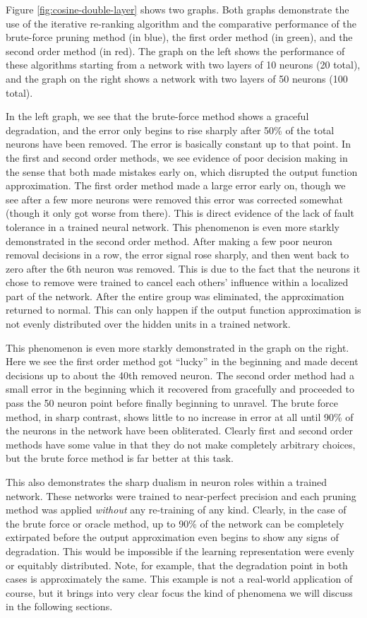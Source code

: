 Figure \ref{fig:cosine-double-layer} shows two graphs. Both graphs demonstrate the use of the iterative re-ranking algorithm and the comparative performance of the brute-force pruning method (in blue), the first order method (in green), and the second order method (in red). The graph on the left shows the performance of these algorithms starting from a network with two layers of 10 neurons (20 total), and the graph on the right shows a network with two layers of 50 neurons (100 total). 

In the left graph, we see that the brute-force method shows a graceful degradation, and the error only begins to rise sharply after 50\% of the total neurons have been removed. The error is basically constant up to that point. In the first and second order methods, we see evidence of poor decision making in the sense that both made mistakes early on, which disrupted the output function approximation. The first order method made a large error early on, though we see after a few more neurons were removed this error was corrected somewhat (though it only got worse from there). This is direct evidence of the lack of fault tolerance in a trained neural network. This phenomenon is even more starkly demonstrated in the second order method. After making a few poor neuron removal decisions in a row, the error signal rose sharply, and then went back to zero after the 6th neuron was removed. This is due to the fact that the neurons it chose to remove were trained to cancel each others' influence within a localized part of the network. After the entire group was eliminated, the approximation returned to normal. This can only happen if the output function approximation is not evenly distributed over the hidden units in a trained network. 

This phenomenon is even more starkly demonstrated in the graph on the right. Here we see the first order method got ``lucky'' in the beginning and made decent decisions up to about the 40th removed neuron. The second order method had a small error in the beginning which it recovered from gracefully and proceeded to pass the 50 neuron point before finally beginning to unravel. The brute force method, in sharp contrast, shows little to no increase in error at all until 90\% of the neurons in the network have been obliterated. Clearly first and second order methods have some value in that they do not make completely arbitrary choices, but the brute force method is far better at this task. 

This also demonstrates the sharp dualism in neuron roles within a trained network. These networks were trained to near-perfect precision and each pruning method was applied \textit{without} any re-training of any kind. Clearly, in the case of the brute force or oracle method, up to 90\% of the network can be completely extirpated before the output approximation even begins to show any signs of degradation. This would be impossible if the learning representation were evenly or equitably distributed. Note, for example, that the degradation point in both cases is approximately the same. This example is not a real-world application of course, but it brings into very clear focus the kind of phenomena we will discuss in the following sections. 

